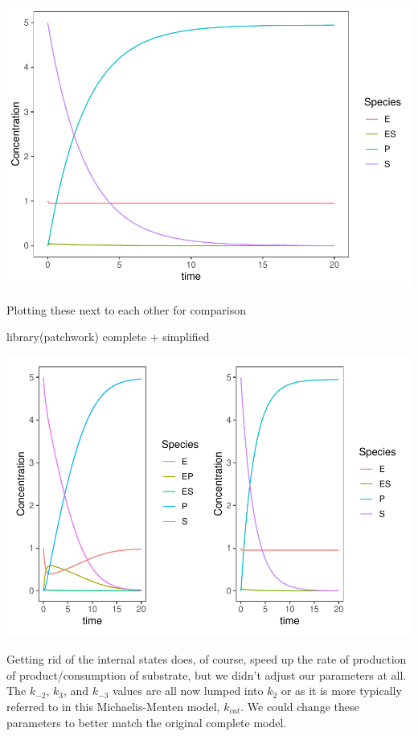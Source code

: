 \documentclass[
]{article}
\newenvironment{Shaded}{\begin{snugshade}}{\end{snugshade}}
\newcommand{\FunctionTok}[1]{\textcolor[rgb]{0.00,0.00,0.00}{#1}}
\newcommand{\NormalTok}[1]{#1}
\newcommand{\SpecialCharTok}[1]{\textcolor[rgb]{0.00,0.00,0.00}{#1}}
\begin{document}
\includegraphics{Bioprocess_Engineering_files/figure-latex/unnamed-chunk-23-1.pdf}

Plotting these next to each other for comparison

\begin{Shaded}
\begin{Highlighting}[]
\FunctionTok{library}\NormalTok{(patchwork)}
\NormalTok{complete }\SpecialCharTok{+}\NormalTok{ simplified}
\end{Highlighting}
\end{Shaded}

\includegraphics{Bioprocess_Engineering_files/figure-latex/unnamed-chunk-24-1.pdf}

Getting rid of the internal states does, of course, speed up the rate of production of product/consumption of substrate, but we didn't adjust our parameters at all. The \(k_{-2}\), \(k_3\), and \(k_{-3}\) values are all now lumped into \(k_2\) or as it is more typically referred to in this Michaelis-Menten model, \(k_{cat}\). We could change these parameters to better match the original complete model.
\end{document}
